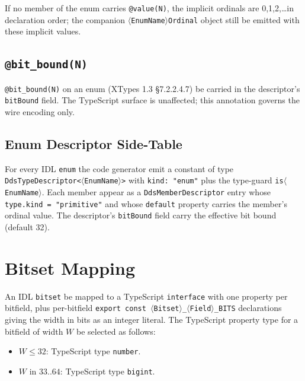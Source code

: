 \documentclass{../styles/zerodds-vendor-spec}
\begin{document}
If no member of the enum carries \texttt{@value(N)}, the implicit
ordinals are 0,1,2,\ldots in declaration order; the companion
\texttt{$\langle$EnumName$\rangle$Ordinal} object 
still be emitted with these implicit values.

\subsection{\texttt{@bit\_bound(N)}}

\texttt{@bit\_bound(N)} on an enum (XTypes 1.3 §7.2.2.4.7)
 be carried in the descriptor's \texttt{bitBound}
field. The TypeScript surface is unaffected; this annotation
governs the wire encoding only.

\subsection{Enum Descriptor Side-Table}\label{sec:enum-descriptor}

For every IDL \texttt{enum} the code generator  emit
a constant of type \texttt{DdsTypeDescriptor<$\langle$EnumName$\rangle$>}
with \texttt{kind:\,"enum"} plus the type-guard
\texttt{is$\langle$EnumName$\rangle$}. Each member 
appear as a \texttt{DdsMemberDescriptor} entry whose
\texttt{type.kind\,=\,"primitive"} and whose \texttt{default}
property carries the member's ordinal value. The descriptor's
\texttt{bitBound} field  carry the effective bit
bound (default 32).

\section{Bitset Mapping}\label{sec:bitset-mapping}

An IDL \texttt{bitset}  be mapped to a TypeScript
\texttt{interface} with one property per bitfield, plus
per-bitfield
\texttt{export const $\langle$Bitset$\rangle$\_$\langle$Field$\rangle$\_BITS}
declarations giving the width in bits as an integer literal. The
TypeScript property type for a bitfield of width $W$
 be selected as follows:

\begin{itemize}[noitemsep]
  \item $W \leq 32$: TypeScript type \texttt{number}.
  \item $W$ in $33..64$: TypeScript type \texttt{bigint}.
\end{itemize}
\end{document}
